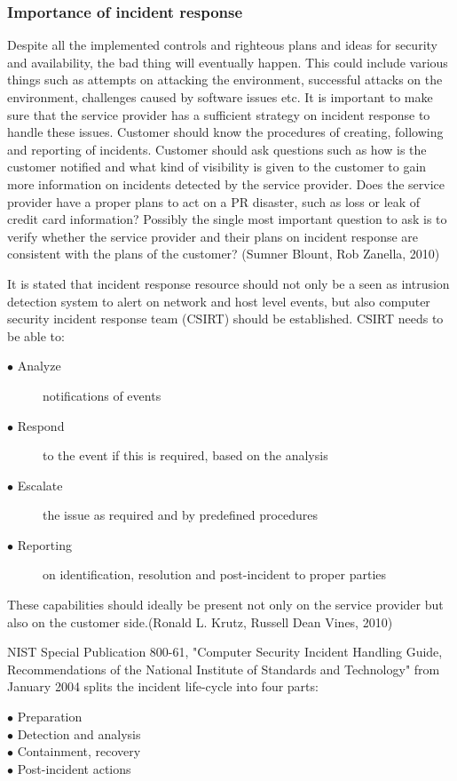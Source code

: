 \documentclass{article}
\begin{document}
\subsubsection{Importance of incident response}
Despite all the implemented controls and righteous plans and ideas for security and availability, the bad thing will eventually happen. This could include various things such as attempts on attacking the environment, successful attacks on the environment, challenges caused by software issues etc. It is important to make sure that the service provider has a sufficient strategy on incident response to handle these issues. Customer should know the procedures of creating, following and reporting of incidents. Customer should ask questions such as how is the customer notified and what kind of visibility is given to the customer to gain more information on incidents detected by the service provider. Does the service provider have a proper plans to act on a PR disaster, such as loss or leak of credit card information? Possibly the single most important question to ask is to verify whether the service provider and their plans on incident response are consistent with the plans of the customer? (Sumner Blount, Rob Zanella, 2010)
\par
It is stated that incident response resource should not only be a seen as intrusion detection system to alert on network and host level events, but also computer security incident response team (CSIRT) should be established. CSIRT needs to be able to:
\begin{description}
	\item[$\bullet$ Analyze] notifications of events
	\item[$\bullet$ Respond] to the event if this is required, based on the analysis
	\item[$\bullet$ Escalate] the issue as required and by predefined procedures
	\item[$\bullet$ Reporting] on identification, resolution and post-incident to proper parties
\end{description}
These capabilities should ideally be present not only on the service provider but also on the customer side.(Ronald L. Krutz, Russell Dean Vines, 2010)
\par
NIST Special Publication 800-61, "Computer Security Incident Handling Guide, Recommendations of the National Institute of Standards and Technology" from January 2004 splits the incident life-cycle into four parts:
\begin{description}
	\item[$\bullet$ Preparation]
	\item[$\bullet$ Detection and analysis]
	\item[$\bullet$ Containment, recovery]
	\item[$\bullet$ Post-incident actions]
\end{description}
\end{document}

